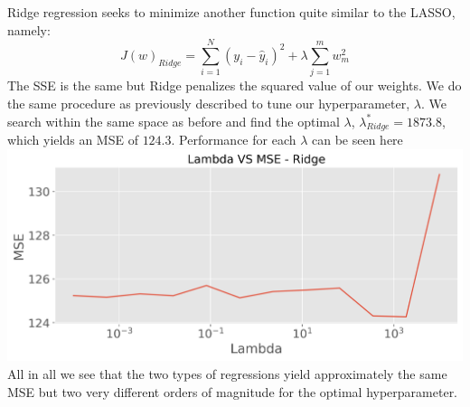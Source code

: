 \documentclass[12pt,a4paper]{article}
\begin{document}
Ridge regression seeks to minimize another function quite similar to the LASSO, namely:
$$J(w)_{Ridge} = \sum_{i = 1}^{N}(y_i - \hat{y}_i)^2 + \lambda \sum_{j=1}^{m}w_m^2$$
The SSE is the same but Ridge penalizes the squared value of our weights. We do the same procedure as previously described to tune our hyperparameter, $\lambda$. We search within the same space as before and find the optimal $\lambda$, $\lambda^*_{Ridge} = 1873.8$, which yields an MSE of $124.3$. Performance for each $\lambda$ can be seen here\\
\includegraphics[scale = 0.7]{Ridge_MSE.png}
\\
All in all we see that the two types of regressions yield approximately the same MSE but two very different orders of magnitude for the optimal hyperparameter. 
\end{document}
